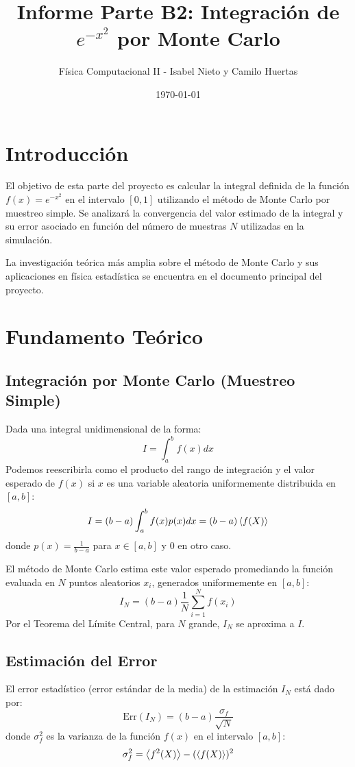 \documentclass[11pt,a4paper]{article}
\title{Informe Parte B2: Integración de $e^{-x^2}$ por Monte Carlo}
\author{Física Computacional II - Isabel Nieto y Camilo Huertas}
\date{\today}
\begin{document}
\maketitle
\tableofcontents
\newpage

\section{Introducción}
El objetivo de esta parte del proyecto es calcular la integral definida de la función $f(x) = e^{-x^2}$ en el intervalo $[0, 1]$ utilizando el método de Monte Carlo por muestreo simple. Se analizará la convergencia del valor estimado de la integral y su error asociado en función del número de muestras $N$ utilizadas en la simulación.

La investigación teórica más amplia sobre el método de Monte Carlo y sus aplicaciones en física estadística se encuentra en el documento principal del proyecto.

\section{Fundamento Teórico}

\subsection{Integración por Monte Carlo (Muestreo Simple)}
Dada una integral unidimensional de la forma:
\begin{equation}
    I = \int_a^b f(x) dx
\end{equation}
Podemos reescribirla como el producto del rango de integración y el valor esperado de $f(x)$ si $x$ es una variable aleatoria uniformemente distribuida en $[a,b]$:
\begin{equation}
    I = (b-a) \int_a^b f(x) p(x) dx = (b-a) \expval{f(X)}
\end{equation}
donde $p(x) = \frac{1}{b-a}$ para $x \in [a,b]$ y $0$ en otro caso.

El método de Monte Carlo estima este valor esperado promediando la función evaluada en $N$ puntos aleatorios $x_i$, generados uniformemente en $[a,b]$:
\begin{equation}
    I_N = (b-a) \frac{1}{N} \sum_{i=1}^N f(x_i)
\end{equation}
Por el Teorema del Límite Central, para $N$ grande, $I_N$ se aproxima a $I$.

\subsection{Estimación del Error}
El error estadístico (error estándar de la media) de la estimación $I_N$ está dado por:
\begin{equation}
    \text{Err}(I_N) = (b-a) \frac{\sigma_f}{\sqrt{N}}
\end{equation}
donde $\sigma_f^2$ es la varianza de la función $f(x)$ en el intervalo $[a,b]$:
\begin{equation}
    \sigma_f^2 = \expval{f^2(X)} - (\expval{f(X)})^2
\end{equation}
\end{document}
